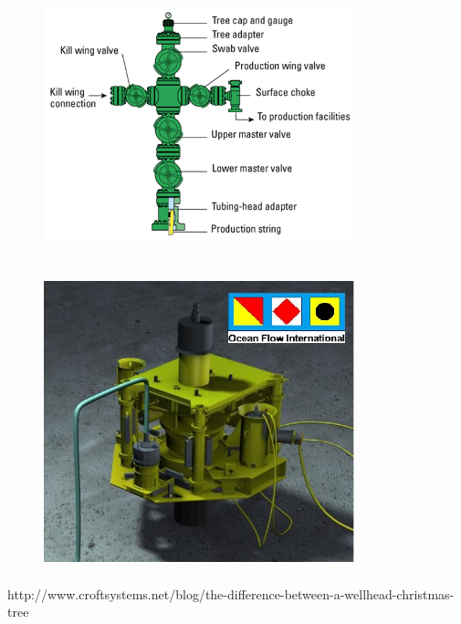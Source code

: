 \documentclass[DIV=calc, paper=a4, fontsize=13pt, twocolumn]{scrartcl}	 %
\begin{document}
\begin{figure}[h]
\includegraphics[width=9cm,height=8.5cm]{xmas_tree_diagram.png}
\includegraphics[width=9cm,height=8.5cm]{Ocean_Flow_Subsea_Tree_002.JPG}
\end{figure}





\newpage
\begin{thebibliography}{99} %
\newblock http://www.croftsystems.net/blog/the-difference-between-a-wellhead-christmas-tree
\end{thebibliography}


\end{document}
